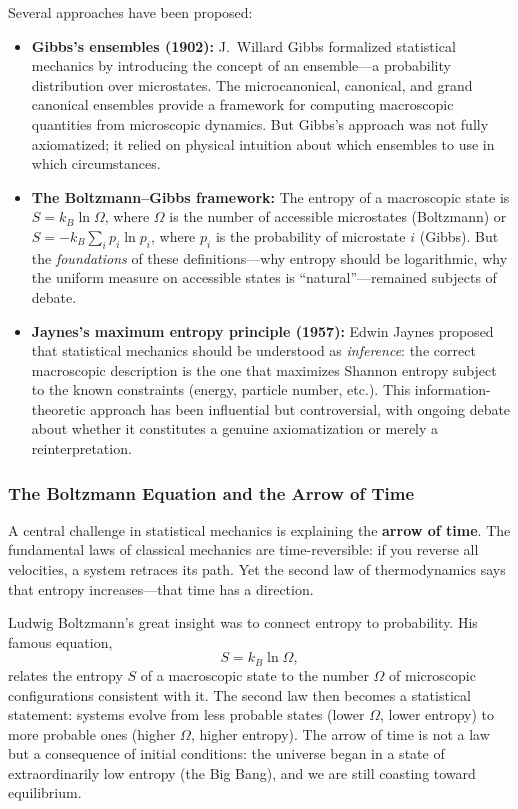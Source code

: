 Several approaches have been proposed:

\begin{itemize}
    \item \textbf{Gibbs's ensembles (1902):} J.\ Willard Gibbs formalized statistical mechanics by introducing the concept of an ensemble---a probability distribution over microstates. The microcanonical, canonical, and grand canonical ensembles provide a framework for computing macroscopic quantities from microscopic dynamics. But Gibbs's approach was not fully axiomatized; it relied on physical intuition about which ensembles to use in which circumstances.

    \item \textbf{The Boltzmann--Gibbs framework:} The entropy of a macroscopic state is $S = k_B \ln \Omega$, where $\Omega$ is the number of accessible microstates (Boltzmann) or $S = -k_B \sum_i p_i \ln p_i$, where $p_i$ is the probability of microstate $i$ (Gibbs). But the \emph{foundations} of these definitions---why entropy should be logarithmic, why the uniform measure on accessible states is ``natural''---remained subjects of debate.

    \item \textbf{Jaynes's maximum entropy principle (1957):} Edwin Jaynes proposed that statistical mechanics should be understood as \emph{inference}: the correct macroscopic description is the one that maximizes Shannon entropy subject to the known constraints (energy, particle number, etc.). This information-theoretic approach has been influential but controversial, with ongoing debate about whether it constitutes a genuine axiomatization or merely a reinterpretation.
\end{itemize}

\subsubsection{The Boltzmann Equation and the Arrow of Time}

A central challenge in statistical mechanics is explaining the \textbf{arrow of time}. The fundamental laws of classical mechanics are time-reversible: if you reverse all velocities, a system retraces its path. Yet the second law of thermodynamics says that entropy increases---that time has a direction.

Ludwig Boltzmann's great insight was to connect entropy to probability. His famous equation,
\[
S = k_B \ln \Omega,
\]
relates the entropy $S$ of a macroscopic state to the number $\Omega$ of microscopic configurations consistent with it. The second law then becomes a statistical statement: systems evolve from less probable states (lower $\Omega$, lower entropy) to more probable ones (higher $\Omega$, higher entropy). The arrow of time is not a law but a consequence of initial conditions: the universe began in a state of extraordinarily low entropy (the Big Bang), and we are still coasting toward equilibrium.

